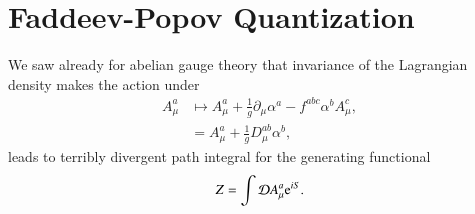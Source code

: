 \section{Faddeev-Popov Quantization}
We saw already for abelian gauge theory that invariance of the Lagrangian density makes the action under 
\begin{align}
   A^a_\mu &\mapsto A^a_\mu + \frac{1}{g} \partial_\mu \alpha^a - f^{abc} \alpha^b A_\mu^c, \\
           &= A^a_\mu + \frac{1}{g}D_{\mu}^{ab}\alpha^b ,
\end{align}
leads to terribly divergent  path integral for the generating functional
\begin{align*}
   Z = \int \mathcal{D} A_\mu^a \mathrm{e}^{iS}.
\end{align*}

